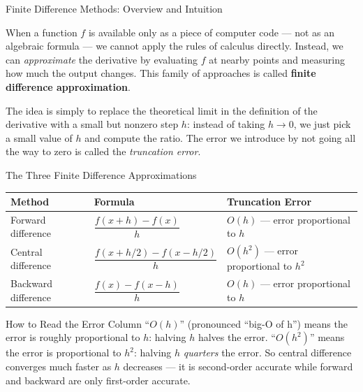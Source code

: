 \documentclass[aspectratio=169,10pt]{beamer}
\begin{document}
\begin{frame}[allowframebreaks]{Finite Difference Methods: Overview and Intuition}

  When a function $f$ is available only as a piece of computer code --- not
  as an algebraic formula --- we cannot apply the rules of calculus directly.
  Instead, we can \emph{approximate} the derivative by evaluating $f$ at
  nearby points and measuring how much the output changes.  This family of
  approaches is called \textbf{finite difference approximation}.

  The idea is simply to replace the theoretical limit in the definition of the
  derivative with a small but nonzero step $h$:
  instead of taking $h \to 0$, we just pick a small value of $h$ and compute
  the ratio.  The error we introduce by not going all the way to zero is
  called the \emph{truncation error}.

  \begin{block}{The Three Finite Difference Approximations}
    \renewcommand{\arraystretch}{2.0}
    \begin{tabular}{lll}
      \toprule
      \textbf{Method} & \textbf{Formula} & \textbf{Truncation Error} \\
      \midrule
      Forward difference
        & $\dfrac{f(x+h)-f(x)}{h}$
        & $O(h)$ --- error proportional to $h$ \\
      Central difference
        & $\dfrac{f(x+h/2)-f(x-h/2)}{h}$
        & $O(h^2)$ --- error proportional to $h^2$ \\
      Backward difference
        & $\dfrac{f(x)-f(x-h)}{h}$
        & $O(h)$ --- error proportional to $h$ \\
      \bottomrule
    \end{tabular}
  \end{block}

  \begin{alertblock}{How to Read the Error Column}
    ``$O(h)$'' (pronounced ``big-O of h'') means the error is roughly
    proportional to $h$: halving $h$ halves the error.
    ``$O(h^2)$'' means the error is proportional to $h^2$: halving $h$
    \emph{quarters} the error.  So central difference converges much faster
    as $h$ decreases --- it is second-order accurate while forward and
    backward are only first-order accurate.
  \end{alertblock}

\end{frame}
\end{document}
